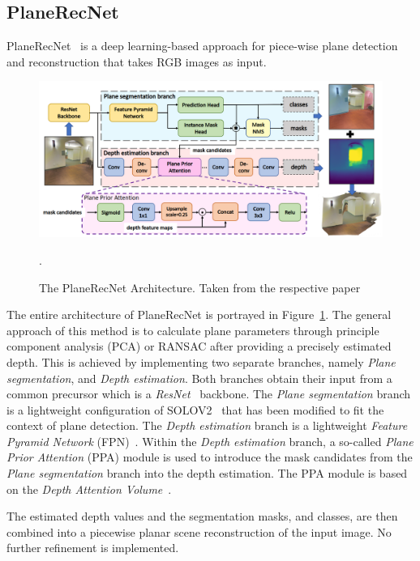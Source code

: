 \documentclass[main.tex]{subfiles}
\begin{document}
\subsection{PlaneRecNet}
\label{subsec:bg-planerecnet}
PlaneRecNet~\cite{Xie_Shu_Rambach_Pagani_Stricker_2022} is a deep learning-based approach for piece-wise plane detection and reconstruction that takes RGB images
as input.
\begin{figure}[H]
    \centering
    \includegraphics[width=\textwidth]{images/planerecnet.png}
    \caption[PlaneRecNet Architecture]{The PlaneRecNet Architecture. Taken from the respective paper~\cite[Figure~1]{Xie_Shu_Rambach_Pagani_Stricker_2022}}.
    \label{fig:planerecnet}
\end{figure}

The entire architecture of PlaneRecNet is portrayed in Figure~\ref{fig:planerecnet}.
The general approach of this method is to calculate plane parameters through principle component analysis (PCA) or RANSAC
after providing a precisely estimated depth.
This is achieved by implementing two separate branches, namely \textit{Plane segmentation}, and \textit{Depth estimation}.
Both branches obtain their input from a common precursor which is a \textit{ResNet}~\cite{He_Zhang_Ren_Sun_2015} backbone.
The \textit{Plane segmentation} branch is a lightweight configuration of SOLOV2~\cite{wang2020solov2} that has been modified to
fit the context of plane detection.
The \textit{Depth estimation} branch is a lightweight \textit{Feature Pyramid Network} (FPN)~\cite{Lin_Dollár_Girshick_He_Hariharan_Belongie_2017}.
Within the \textit{Depth estimation} branch, a so-called \textit{Plane Prior Attention} (PPA) module is used to introduce
the mask candidates from the \textit{Plane segmentation} branch into the depth estimation. The PPA module is based
on the \textit{Depth Attention Volume}~\cite{Huynh_Nguyen-Ha_Matas_Rahtu_Heikkila_2020}.

The estimated depth values and the segmentation masks, and classes, are then combined into a piecewise planar
scene reconstruction of the input image. No further refinement is implemented.
\end{document}
